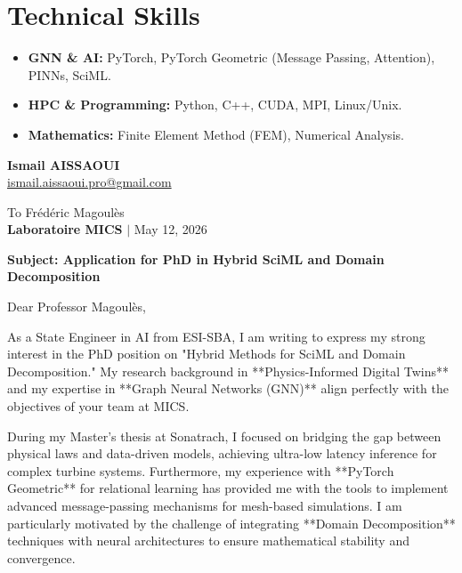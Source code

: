 \documentclass[a4paper,11pt]{article}
\begin{document}
\section{Technical Skills}
\begin{itemize}
    \item \textbf{GNN \& AI:} PyTorch, PyTorch Geometric (Message Passing, Attention), PINNs, SciML.
    \item \textbf{HPC \& Programming:} Python, C++, CUDA, MPI, Linux/Unix.
    \item \textbf{Mathematics:} Finite Element Method (FEM), Numerical Analysis.
\end{itemize}

\newpage

\begin{flushleft}
    \textbf{Ismail AISSAOUI} \\
    \href{mailto:ismail.aissaoui.pro@gmail.com}{ismail.aissaoui.pro@gmail.com}
\end{flushleft}

\begin{flushright}
    To Frédéric Magoulès \\
    \textbf{Laboratoire MICS} $|$ May 12, 2026
\end{flushright}

\bigskip
\noindent \textbf{Subject: Application for PhD in Hybrid SciML and Domain Decomposition}
\bigskip

Dear Professor Magoulès,

As a State Engineer in AI from ESI-SBA, I am writing to express my strong interest in the PhD position on "Hybrid Methods for SciML and Domain Decomposition." My research background in **Physics-Informed Digital Twins** and my expertise in **Graph Neural Networks (GNN)** align perfectly with the objectives of your team at MICS.

During my Master's thesis at Sonatrach, I focused on bridging the gap between physical laws and data-driven models, achieving ultra-low latency inference for complex turbine systems. Furthermore, my experience with **PyTorch Geometric** for relational learning has provided me with the tools to implement advanced message-passing mechanisms for mesh-based simulations. I am particularly motivated by the challenge of integrating **Domain Decomposition** techniques with neural architectures to ensure mathematical stability and convergence.
\end{document}
